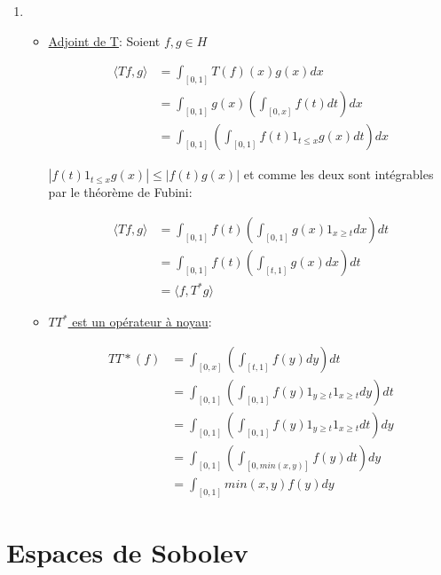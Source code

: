 \documentclass[10pt,a4paper,oneside]{article}
\newenvironment{solution}[1][Solution]{\begin{trivlist}
\item[\hskip \labelsep {\bfseries #1}]}{\end{trivlist}}
\begin{document}
\begin{solution}

\begin{enumerate}

\item
\begin{itemize}

\item
\underline{Adjoint de T}: Soient $f,g \in H$

\begin{align}
\langle Tf,g \rangle &= \int_{[0,1]}T(f)(x)g(x)dx  \nonumber \\
&= \int_{[0,1]}g(x) (\int_{[0,x]}f(t)dt)dx  \nonumber \\
&= \int_{[0,1]} (\int_{[0,1]} f(t) 1_{t \leq x}g(x)dt)dx \nonumber
\end{align}

$| f(t) 1_{t \leq x}g(x) | \leq |f(t)g(x)|$ et comme les deux sont intégrables par le théorème de Fubini:

\begin{align}
\langle Tf,g \rangle &= \int_{[0,1]} f(t) (\int_{[0,1]} g(x) 1_{x \geq t} dx) dt \nonumber \\
&= \int_{[0,1]} f(t) (\int_{[t,1]} g(x)dx) dt \nonumber \\
&= \langle f,T^*g \rangle \nonumber
\end{align}

\item
\underline{$TT^*$ est un opérateur à noyau}:

\begin{align}
TT*(f) &= \int_{[0,x]} (\int_{[t,1]} f(y) dy) dt \nonumber \\
&= \int_{[0,1]} (\int_{[0,1]} f(y) 1_{y \geq t} 1_{x \geq t} dy) dt \nonumber \\
&= \int_{[0,1]} (\int_{[0,1]} f(y) 1_{y \geq t} 1_{x \geq t} dt) dy \nonumber \\
&= \int_{[0,1]} (\int_{[0,min(x,y)]}  f(y) dt) dy \nonumber \\
&= \int_{[0,1]} min(x,y) f(y) dy \nonumber
\end{align}

\end{itemize}

\end{enumerate}

\end{solution}

\section{Espaces de Sobolev}

\end{document}
